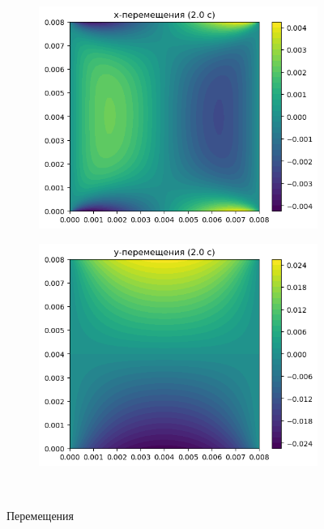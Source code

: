 \documentclass[12pt, a4paper]{article}
\begin{document}
\begin{figure}[H]
	\centering
	\begin{subfigure}[H]{0.38\textwidth}
		\includegraphics[width=\textwidth]{ux_2c}
	\end{subfigure}
	\qquad\qquad
	\begin{subfigure}[H]{0.38\textwidth}
		\includegraphics[width=\textwidth]{uy_2c}
	\end{subfigure}	
	\\[0.2cm]
	\caption{Перемещения}
\end{figure}	
\end{document}
